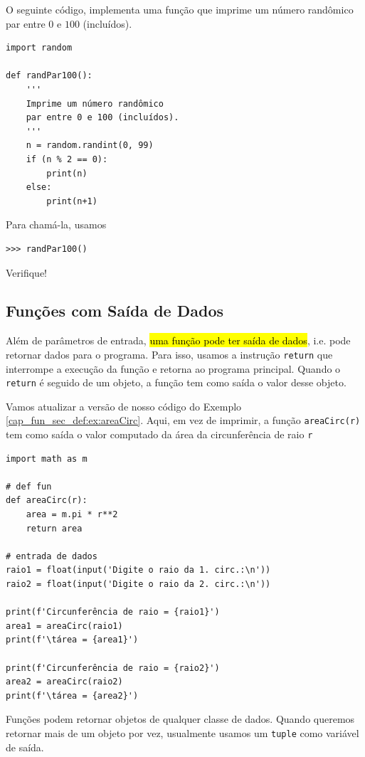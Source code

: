 \begin{ex}
  O seguinte código, implementa uma função que imprime um número randômico par entre $0$ e $100$ (incluídos).
\begin{lstlisting}
import random

def randPar100():
    '''
    Imprime um número randômico
    par entre 0 e 100 (incluídos).
    '''
    n = random.randint(0, 99)
    if (n % 2 == 0):
        print(n)
    else:
        print(n+1)
\end{lstlisting}
  Para chamá-la, usamos
\begin{lstlisting}
>>> randPar100()
\end{lstlisting}
  Verifique!
\end{ex}

\subsection{Funções com Saída de Dados}

Além de parâmetros de entrada, \hl{uma função pode ter saída de dados}, i.e. pode retornar dados para o programa. Para isso, usamos a instrução \lstinline+return+ que interrompe a execução da função e retorna ao programa principal. Quando o \lstinline+return+ é seguido de um objeto, a função tem como saída o valor desse objeto.

\begin{ex}
  Vamos atualizar a versão de nosso código do Exemplo \ref{cap_fun_sec_def:ex:areaCirc}. Aqui, em vez de imprimir, a função \lstinline+areaCirc(r)+ tem como saída o valor computado da área da circunferência de raio \lstinline+r+
\begin{lstlisting}
import math as m

# def fun
def areaCirc(r):
    area = m.pi * r**2
    return area
    
# entrada de dados
raio1 = float(input('Digite o raio da 1. circ.:\n'))
raio2 = float(input('Digite o raio da 2. circ.:\n'))

print(f'Circunferência de raio = {raio1}')
area1 = areaCirc(raio1)
print(f'\tárea = {area1}')

print(f'Circunferência de raio = {raio2}')
area2 = areaCirc(raio2)
print(f'\tárea = {area2}')
\end{lstlisting}
\end{ex}

Funções podem retornar objetos de qualquer classe de dados. Quando queremos retornar mais de um objeto por vez, usualmente usamos um \lstinline+tuple+ como variável de saída.

